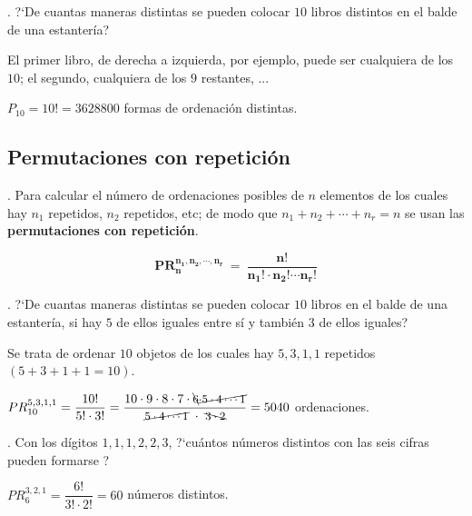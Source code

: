 \begin{example}
	. ?`De cuantas maneras distintas se pueden colocar $10$ libros distintos en el balde de una estantería?
	
	\vspace{4mm} El primer libro, de derecha a izquierda, por ejemplo, puede ser cualquiera de los $10$; el segundo, cualquiera de los $9$ restantes, ...
	
	\vspace{2mm} $P_{10}=10!=3628800$ formas de ordenación distintas.	
\end{example}


\subsection{Permutaciones con repetición}

\begin{definition}
	. Para calcular el número de ordenaciones posibles de $n$ elementos de los cuales hay $n_1$ repetidos, $n_2$ repetidos, etc; de modo que $n_1+n_2+\cdots +n_r=n$ se usan las \textbf{permutaciones con repetición}.
	
	$$ \boxed{ \ \boldsymbol{ PR_n^{n_1,n_2,\cdots ,n_r} \ = \ \dfrac{n!}{n_1!\cdot n_2! \cdots n_r!} } \ } $$	
\end{definition}

\begin{example}
	. ?`De cuantas maneras distintas se pueden colocar $10$ libros  en el balde de una estantería, si hay $5$ de ellos iguales entre sí y también $3$ de ellos iguales?
	
	\vspace{4mm} Se trata de ordenar $10$ objetos de los cuales hay $5,3,1,1$ repetidos \textcolor{gris}{$(5+3+1+1=10)$.}
	
	\vspace{2mm} $PR_{10}^{5,3,1,1}=\dfrac{10!}{5! \cdot 3!}= \small{\dfrac{10\cdot 9 \cdot 8 \cdot 7 \cdot \bcancel{6} \cancel{\cdot 5 \cdot 4 \cdots 1}}{\cancel{5\cdot 4\cdots 1} \ \cdot \ \bcancel{3\cdot 2}}}=5040$ \normalsize{ordenaciones.}	
\end{example}

\begin{example}
	. Con los dígitos $1,1,1,2,2,3$, ?`cuántos números distintos con las  seis cifras pueden formarse	?
	
	\vspace{4mm} $PR_6^{3,2,1}=\dfrac{6!}{3!\cdot 2!}=60$ números distintos.
\end{example}

